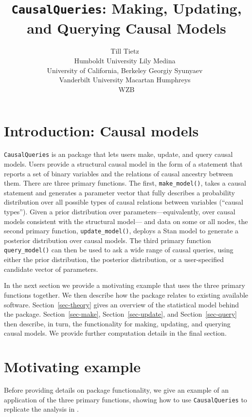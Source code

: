 \documentclass[
  11pt,
  article]{jss}
\author{Till Tietz~\orcidlink{0000-0002-2916-9059}\\Humboldt
University \And Lily Medina~\orcidlink{0009-0004-2423-524X}\\University
of California, Berkeley \AND Georgiy
Syunyaev~\orcidlink{0000-0002-4391-6313}\\Vanderbilt
University \And Macartan Humphreys~\orcidlink{0000-0001-7029-2326}\\WZB}
\title{\texttt{CausalQueries}: Making, Updating, and Querying Causal
Models}
\begin{document}
\maketitle


\section{Introduction: Causal models}\label{sec-intro}

\texttt{CausalQueries} is an  package that lets users make,
update, and query causal models. Users provide a structural causal model
in the form of a statement that reports a set of binary variables and
the relations of causal ancestry between them. There are three primary
functions. The first, \texttt{make\_model()}, takes a causal statement
and generates a parameter vector that fully describes a probability
distribution over all possible types of causal relations between
variables (``causal types''). Given a prior distribution over
parameters---equivalently, over causal models consistent with the
structural model--- and data on some or all nodes, the second primary
function, \texttt{update\_model()}, deploys a Stan
\citep{carpenter_stan_2017} model to generate a posterior distribution
over causal models. The third primary function \texttt{query\_model()}
can then be used to ask a wide range of causal queries, using either the
prior distribution, the posterior distribution, or a user-specified
candidate vector of parameters.

In the next section we provide a motivating example that uses the three
primary functions together. We then describe how the package relates to
existing available software. Section~\ref{sec-theory} gives an overview
of the statistical model behind the package. Section~\ref{sec-make},
Section~\ref{sec-update}, and Section~\ref{sec-query} then describe, in
turn, the functionality for making, updating, and querying causal
models. We provide further computation details in the final section.

\section{Motivating example}\label{motivating-example}

Before providing details on package functionality, we give an example of
an application of the three primary functions, showing how to use
\texttt{CausalQueries} to replicate the analysis in
\citetext{\citealp{chickering_clinicians_1996}; \citealp[see
also][]{humphreys_integrated_2023}}.
\end{document}
